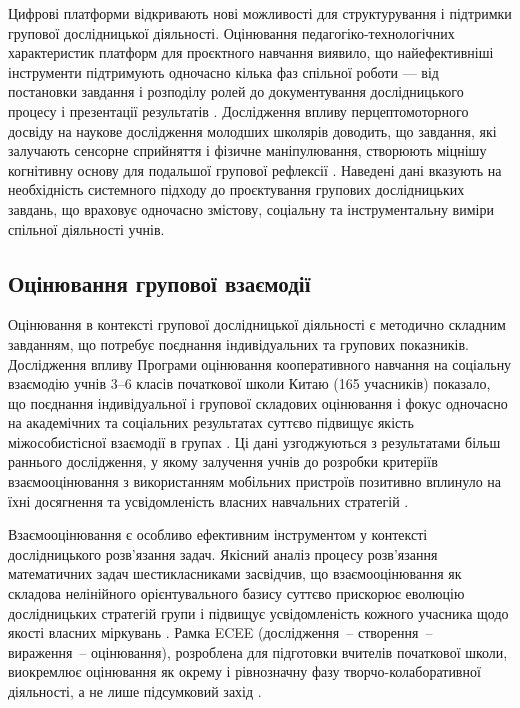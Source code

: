 \documentclass[a4paper,12pt]{article}
\begin{document}
Цифрові платформи відкривають нові можливості для структурування і підтримки групової дослідницької діяльності. Оцінювання педагогіко-технологічних характеристик платформ для проєктного навчання виявило, що найефективніші інструменти підтримують одночасно кілька фаз спільної роботи — від постановки завдання і розподілу ролей до документування дослідницького процесу і презентації результатів \parencite{Baziukė2025}. Дослідження впливу перцептомоторного досвіду на наукове дослідження молодших школярів доводить, що завдання, які залучають сенсорне сприйняття і фізичне маніпулювання, створюють міцнішу когнітивну основу для подальшої групової рефлексії \parencite{Farris2019648}. Наведені дані вказують на необхідність системного підходу до проєктування групових дослідницьких завдань, що враховує одночасно змістову, соціальну та інструментальну виміри спільної діяльності учнів.


\subsection{Оцінювання групової взаємодії}

Оцінювання в контексті групової дослідницької діяльності є методично складним завданням, що потребує поєднання індивідуальних та групових показників. Дослідження впливу Програми оцінювання кооперативного навчання на соціальну взаємодію учнів 3--6 класів початкової школи Китаю (165 учасників) показало, що поєднання індивідуальної і групової складових оцінювання і фокус одночасно на академічних та соціальних результатах суттєво підвищує якість міжособистісної взаємодії в групах \parencite{Zeng2025317}. Ці дані узгоджуються з результатами більш раннього дослідження, у якому залучення учнів до розробки критеріїв взаємооцінювання з використанням мобільних пристроїв позитивно вплинуло на їхні досягнення та усвідомленість власних навчальних стратегій \parencite{Lai2015149}.

Взаємооцінювання є особливо ефективним інструментом у контексті дослідницького розв'язання задач. Якісний аналіз процесу розв'язання математичних задач шестикласниками засвідчив, що взаємооцінювання як складова нелінійного орієнтувального базису суттєво прискорює еволюцію дослідницьких стратегій групи і підвищує усвідомленість кожного учасника щодо якості власних міркувань \parencite{Torregrosa202189}. Рамка ECEE (дослідження~-- створення~-- вираження~-- оцінювання), розроблена для підготовки вчителів початкової школи, виокремлює оцінювання як окрему і рівнозначну фазу творчо-колаборативної діяльності, а не лише підсумковий захід \parencite{Mariati2026}.
\end{document}
